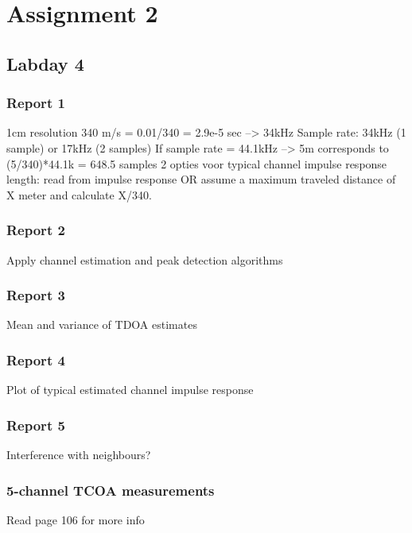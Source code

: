 \documentclass[11pt,titlepage]{report}
\begin{document}
\chapter{Assignment 2}
\section{Labday 4}

\subsection{Report 1}
1cm resolution \@ 340 m/s = 0.01/340 = 2.9e-5 sec --> 34kHz
Sample rate: 34kHz (1 sample) or 17kHz (2 samples)
If sample rate = 44.1kHz --> 5m corresponds to (5/340)*44.1k = 648.5 samples
2 opties voor typical channel impulse response length: read from impulse response OR assume a maximum traveled distance of X meter and calculate X/340.





\subsection{Report 2}
Apply channel estimation and peak detection algorithms

\subsection{Report 3}
Mean and variance of TDOA estimates

\subsection{Report 4}
Plot of typical estimated channel impulse response

\subsection{Report 5}
Interference with neighbours?

\subsection{5-channel TCOA measurements}
Read page 106 for more info
\end{document}
